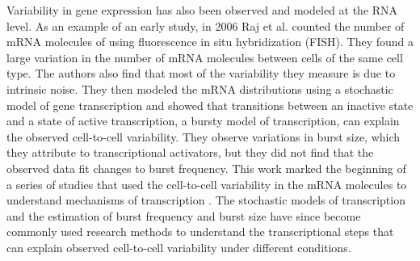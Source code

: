 Variability in gene expression has also been observed and modeled at the RNA level. As an example of an early study, in 2006 Raj et al. \cite{raj2006pb} counted the number of mRNA molecules of using fluorescence in situ hybridization (FISH). They found a large variation in the number of mRNA molecules between cells of the same cell type. The authors also find that most of the variability they measure is due to intrinsic noise. They then modeled the mRNA distributions using a stochastic model of gene transcription and showed that transitions between an inactive state and a state of active transcription, a bursty model of transcription, can explain the observed cell-to-cell variability. They observe variations in burst size, which they attribute to transcriptional activators, but they did not find that the observed data fit changes to burst frequency. This work marked the beginning of a series of studies that used the cell-to-cell variability in the mRNA molecules to understand mechanisms of transcription \cite{symmons2016mc} \cite{chen2018tissues}. The stochastic models of transcription and the estimation of burst frequency and burst size have since become commonly used research methods to understand the transcriptional steps that can explain observed cell-to-cell variability under different conditions.

